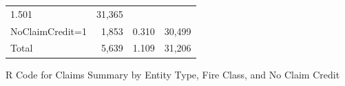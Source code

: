 \documentclass[]{book}
\theoremstyle{definition}
\theoremstyle{definition}
\theoremstyle{definition}
\theoremstyle{remark}
\begin{document}
\begin{longtable}[]{@{}lrrr@{}}
\begin{minipage}[t]{0.15\columnwidth}
1.501\strut
\end{minipage} & \begin{minipage}[t]{0.15\columnwidth}\raggedleft\strut
31,365\strut
\end{minipage}\tabularnewline
\begin{minipage}[t]{0.27\columnwidth}\raggedright\strut
NoClaimCredit=1\strut
\end{minipage} & \begin{minipage}[t]{0.15\columnwidth}\raggedleft\strut
1,853\strut
\end{minipage} & \begin{minipage}[t]{0.15\columnwidth}\raggedleft\strut
0.310\strut
\end{minipage} & \begin{minipage}[t]{0.15\columnwidth}\raggedleft\strut
30,499\strut
\end{minipage}\tabularnewline
\begin{minipage}[t]{0.27\columnwidth}\raggedright\strut
Total\strut
\end{minipage} & \begin{minipage}[t]{0.15\columnwidth}\raggedleft\strut
5,639\strut
\end{minipage} & \begin{minipage}[t]{0.15\columnwidth}\raggedleft\strut
1.109\strut
\end{minipage} & \begin{minipage}[t]{0.15\columnwidth}\raggedleft\strut
31,206\strut
\end{minipage}\tabularnewline
\bottomrule
\end{longtable}

R Code for Claims Summary by Entity Type, Fire Class, and No Claim
Credit
\end{document}
